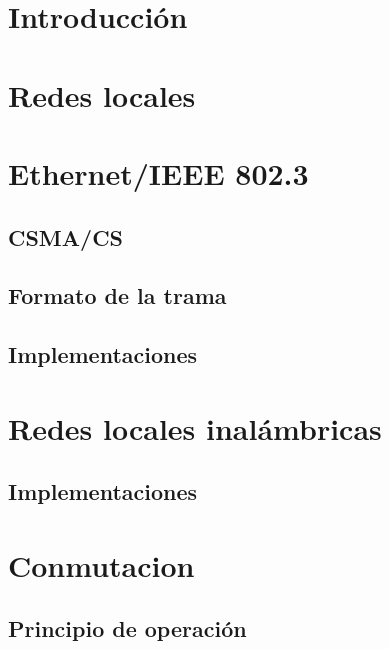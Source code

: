 \documentclass[
]{book}
\begin{document}
\hypertarget{introducciuxf3n-2}{%
\section{Introducción}\label{introducciuxf3n-2}}

\hypertarget{redes-locales-1}{%
\section{Redes locales}\label{redes-locales-1}}

\hypertarget{ethernetieee-802.3}{%
\section{Ethernet/IEEE 802.3}\label{ethernetieee-802.3}}

\hypertarget{csmacs}{%
\subsection{CSMA/CS}\label{csmacs}}

\hypertarget{formato-de-la-trama}{%
\subsection{Formato de la trama}\label{formato-de-la-trama}}

\hypertarget{implementaciones}{%
\subsection{Implementaciones}\label{implementaciones}}

\hypertarget{redes-locales-inaluxe1mbricas}{%
\section{Redes locales inalámbricas}\label{redes-locales-inaluxe1mbricas}}

\hypertarget{implementaciones-1}{%
\subsection{Implementaciones}\label{implementaciones-1}}

\hypertarget{conmutacion}{%
\section{Conmutacion}\label{conmutacion}}

\hypertarget{principio-de-operaciuxf3n}{%
\subsection{Principio de operación}\label{principio-de-operaciuxf3n}}
\end{document}
